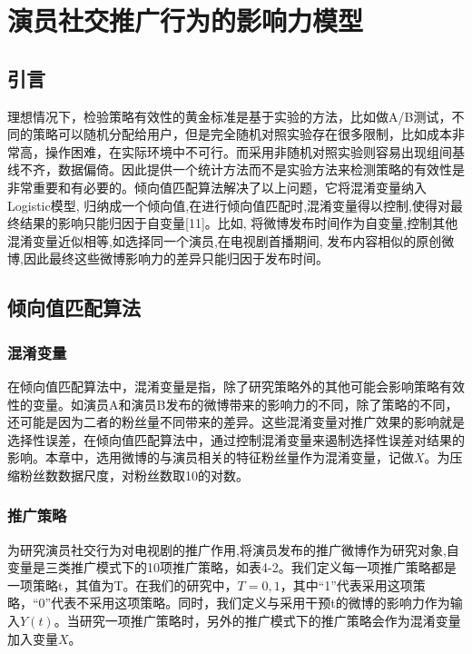 \chapter{演员社交推广行为的影响力模型}
\label{model}

\section{引言}
理想情况下，检验策略有效性的黄金标准是基于实验的方法，比如做A/B测试，不同的策略可以随机分配给用户，但是完全随机对照实验存在很多限制，比如成本非常高，操作困难，在实际环境中不可行。而采用非随机对照实验则容易出现组间基线不齐，数据偏倚。因此提供一个统计方法而不是实验方法来检测策略的有效性是非常重要和有必要的。倾向值匹配算法解决了以上问题，它将混淆变量纳入Logistic模型, 归纳成一个倾向值,在进行倾向值匹配时,混淆变量得以控制,使得对最终结果的影响只能归因于自变量[11]。比如, 将微博发布时间作为自变量,控制其他混淆变量近似相等,如选择同一个演员,在电视剧首播期间, 发布内容相似的原创微博,因此最终这些微博影响力的差异只能归因于发布时间。

\section{倾向值匹配算法}
\subsection{混淆变量}
在倾向值匹配算法中，混淆变量是指，除了研究策略外的其他可能会影响策略有效性的变量。如演员A和演员B发布的微博带来的影响力的不同，除了策略的不同，还可能是因为二者的粉丝量不同带来的差异。这些混淆变量对推广效果的影响就是选择性误差，在倾向值匹配算法中，通过控制混淆变量来遏制选择性误差对结果的影响。本章中，选用微博的与演员相关的特征粉丝量作为混淆变量，记做$X$。为压缩粉丝数数据尺度，对粉丝数取10的对数。

\subsection{推广策略}
为研究演员社交行为对电视剧的推广作用,将演员发布的推广微博作为研究对象,自变量是三类推广模式下的10项推广策略，如表4-2。我们定义每一项推广策略都是一项策略t，其值为T。在我们的研究中，$T={0,1}$，其中“1”代表采用这项策略，“0”代表不采用这项策略。同时，我们定义与采用干预t的微博的影响力作为输入$Y(t)$。当研究一项推广策略时，另外的推广模式下的推广策略会作为混淆变量加入变量$X$。


